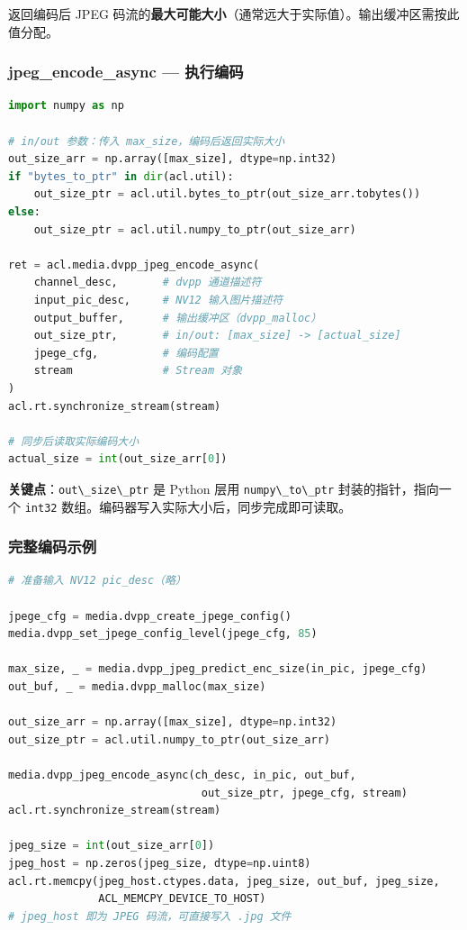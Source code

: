 返回编码后 JPEG
码流的\textbf{最大可能大小}（通常远大于实际值）。输出缓冲区需按此值分配。

\subsubsection{jpeg\_encode\_async ---
执行编码}\label{src-book-chapter6-h123}

\begin{lstlisting}[language=Python]
import numpy as np

# in/out 参数：传入 max_size，编码后返回实际大小
out_size_arr = np.array([max_size], dtype=np.int32)
if "bytes_to_ptr" in dir(acl.util):
    out_size_ptr = acl.util.bytes_to_ptr(out_size_arr.tobytes())
else:
    out_size_ptr = acl.util.numpy_to_ptr(out_size_arr)

ret = acl.media.dvpp_jpeg_encode_async(
    channel_desc,       # dvpp 通道描述符
    input_pic_desc,     # NV12 输入图片描述符
    output_buffer,      # 输出缓冲区（dvpp_malloc）
    out_size_ptr,       # in/out: [max_size] -> [actual_size]
    jpege_cfg,          # 编码配置
    stream              # Stream 对象
)
acl.rt.synchronize_stream(stream)

# 同步后读取实际编码大小
actual_size = int(out_size_arr[0])
\end{lstlisting}

\textbf{关键点}：\passthrough{\lstinline!out\_size\_ptr!} 是 Python 层用
\passthrough{\lstinline!numpy\_to\_ptr!} 封装的指针，指向一个
\passthrough{\lstinline!int32!}
数组。编码器写入实际大小后，同步完成即可读取。

\subsubsection{完整编码示例}\label{src-book-chapter6-h124}

\begin{lstlisting}[language=Python]
# 准备输入 NV12 pic_desc（略）

jpege_cfg = media.dvpp_create_jpege_config()
media.dvpp_set_jpege_config_level(jpege_cfg, 85)

max_size, _ = media.dvpp_jpeg_predict_enc_size(in_pic, jpege_cfg)
out_buf, _ = media.dvpp_malloc(max_size)

out_size_arr = np.array([max_size], dtype=np.int32)
out_size_ptr = acl.util.numpy_to_ptr(out_size_arr)

media.dvpp_jpeg_encode_async(ch_desc, in_pic, out_buf,
                              out_size_ptr, jpege_cfg, stream)
acl.rt.synchronize_stream(stream)

jpeg_size = int(out_size_arr[0])
jpeg_host = np.zeros(jpeg_size, dtype=np.uint8)
acl.rt.memcpy(jpeg_host.ctypes.data, jpeg_size, out_buf, jpeg_size,
              ACL_MEMCPY_DEVICE_TO_HOST)
# jpeg_host 即为 JPEG 码流，可直接写入 .jpg 文件
\end{lstlisting}

